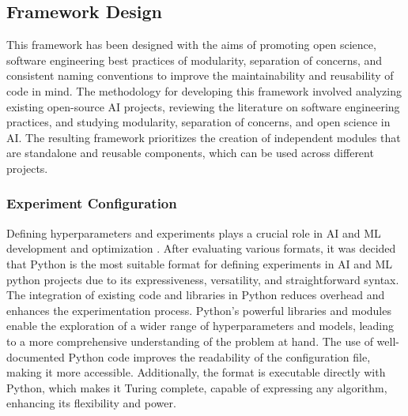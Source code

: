 \subsection{Framework Design}
This framework has been designed with the aims of promoting open science, software engineering best practices of modularity, separation of concerns, and consistent naming conventions to improve the maintainability and reusability of code in mind. The methodology for developing this framework involved analyzing existing open-source AI projects, reviewing the literature on software engineering practices, and studying modularity, separation of concerns, and open science in AI. The resulting framework prioritizes the creation of independent modules that are standalone and reusable components, which can be used across different projects.

\subsubsection{Experiment Configuration}

Defining hyperparameters and experiments plays a crucial role in AI and ML development and optimization \cite{wu2019hyperparameter}. After evaluating various formats, it was decided that Python is the most suitable format for defining experiments in AI and ML python projects due to its expressiveness, versatility, and straightforward syntax. The integration of existing code and libraries in Python reduces overhead and enhances the experimentation process. Python's powerful libraries and modules enable the exploration of a wider range of hyperparameters and models, leading to a more comprehensive understanding of the problem at hand. The use of well-documented Python code improves the readability of the configuration file, making it more accessible. Additionally, the format is executable directly with Python, which makes it Turing complete, capable of expressing any algorithm, enhancing its flexibility and power.







